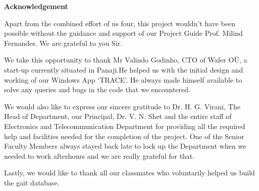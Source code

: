 \begin{center}
\begin{huge}
\bfseries{Acknowledgement}\\
\end{huge}
\end{center}
\vspace{1cm}

\noindent Apart from the combined effort of us four, this project wouldn’t have been possible without the guidance and support of our Project Guide Prof. Milind Fernandes. We are grateful to you Sir.

\noindent We take this opportunity to thank Mr Valindo Godinho, CTO of Wafer OÜ, a start-up currently situated in Panaji.He helped us with the initial design and working of our Windows App ‘TRACE’. He always made himself available to solve any queries and bugs in the code that we encountered.

\noindent We would also like to express our sincere gratitude to Dr. H. G. Virani, The Head of Department, our Principal, Dr. V. N. Shet and the entire staff of Electronics and Telecommunication Department for providing all the required help and facilities needed for the completion of the project. One of the Senior Faculty Members always stayed back late to lock up the Department when we needed to work afterhours and we are really grateful for that. 

\noindent Lastly, we would like to thank all our classmates who voluntarily helped us build the gait database. 







